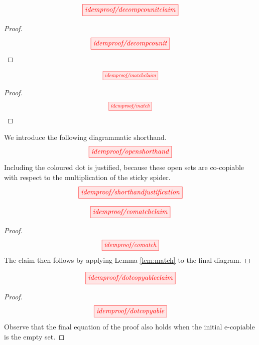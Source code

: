 \newpage
\vspace*{\fill}
\begin{proposition}\label{prop:decompcounit}
\[\scalebox{1}{\tikzfig{idemproof/decompcounitclaim}}\]
\begin{proof}
\[\scalebox{1}{\tikzfig{idemproof/decompcounit}}\]
\end{proof}
\end{proposition}
\vspace*{\fill}

\newpage
{}
\begin{lemma}\label{lem:match}
\[\scalebox{0.75}{\tikzfig{idemproof/matchclaim}}\]
\begin{proof}
\[\scalebox{0.75}{\tikzfig{idemproof/match}}\]
\end{proof}
\end{lemma}

\newpage
\vspace*{\fill}
\begin{convention}
We introduce the following diagrammatic shorthand.
\[\scalebox{1}{\tikzfig{idemproof/openshorthand}}\]
Including the coloured dot is justified, because these open sets are co-copiable with respect to the multiplication of the sticky spider.
\[\scalebox{1}{\tikzfig{idemproof/shorthandjustification}}\]
\end{convention}
\vspace*{\fill}

\newpage
\vspace*{\fill}
\begin{lemma}[Co-match]\label{lem:comatch}
\[\scalebox{1}{\tikzfig{idemproof/comatchclaim}}\]
\begin{proof}
\[\scalebox{0.9}{\tikzfig{idemproof/comatch}}\]
The claim then follows by applying Lemma \ref{lem:match} to the final diagram.
\end{proof}
\end{lemma}
\vspace*{\fill}

\newpage
\vspace*{\fill}
\begin{lemma}\label{lem:ecopyfixpoint}
\[\scalebox{1}{\tikzfig{idemproof/dotcopyableclaim}}\]
\begin{proof}
\[\scalebox{1}{\tikzfig{idemproof/dotcopyable}}\]
Observe that the final equation of the proof also holds when the initial e-copiable is the empty set.
\end{proof}
\end{lemma}
\vspace*{\fill}

